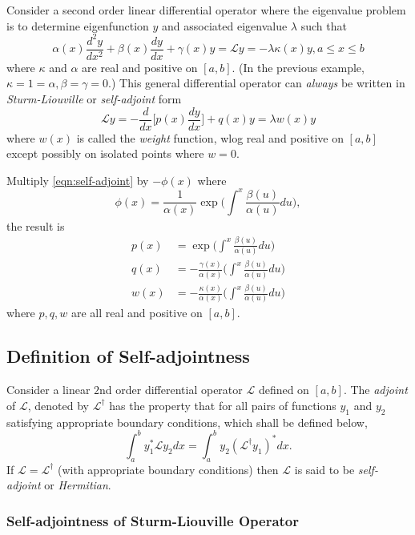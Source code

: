 \documentclass[a4paper]{article}
\renewcommand*\L{\mathcal{L}}
\begin{document}
Consider a second order linear differential operator where the eigenvalue problem is to determine eigenfunction \(y\) and associated eigenvalue \(\lambda\) such that
\begin{equation}
  \label{eqn:self-adjoint}
\alpha(x) \frac{d^2y}{dx^2} + \beta(x) \frac{dy}{dx} + \gamma(x) y = \L y = -\lambda \kappa(x) y, a \leq x\leq b
\tag{\(\ast\)}
\end{equation}
where \(\kappa\) and \(\alpha\) are real and positive on \([a,b]\). (In the previous example, \(\kappa = 1 = \alpha, \beta=\gamma=0\).) This general differential operator can \emph{always} be written in \emph{Sturm-Liouville} or \emph{self-adjoint} form
\[
\L y = - \frac{d}{dx} \Big[ p(x) \frac{dy}{dx} \Big] + q(x) y =\lambda w(x) y
\]
where \(w(x)\) is called the \emph{weight} function, wlog real and positive on \([a,b]\) except possibly on isolated points where \(w=0\).

Multiply \eqref{eqn:self-adjoint} by \(-\phi(x)\) where
\[
\phi(x) = \frac{1}{\alpha(x)}\exp \Big(\int_{ }^{x} \frac{\beta(u)}{\alpha(u)} du \Big),
\]
the result is
\begin{align*}
  p(x) &= \exp \Big( \int^x \frac{\beta(u)}{\alpha(u)}du \Big) \\
  q(x) &= -\frac{\gamma(x)}{\alpha(x)} \Big( \int^x \frac{\beta(u)}{\alpha(u)}du \Big) \\
  w(x) &= -\frac{\kappa(x)}{\alpha(x)} \Big( \int^x \frac{\beta(u)}{\alpha(u)}du \Big)
\end{align*}
where \(p, q, w\) are all real and positive on \([a,b]\).

\subsection{Definition of Self-adjointness}

Consider a linear \(2\)nd order differential operator \(\L\) defined on \([a,b]\). The \emph{adjoint} of \(\L\), denoted by \(\L^\dag\) has the property that for all pairs of functions \(y_1\) and \(y_2\) satisfying appropriate boundary conditions, which shall be defined below,
\[
\int_a^b y_1^* \L y_2 dx = \int_a^b y_2 (\L^\dag y_1)^* dx.
\]
If \(\L = \L^\dag\) (with appropriate boundary conditions) then \(\L\) is said to be \emph{self-adjoint} or \emph{Hermitian}.

\subsubsection{Self-adjointness of Sturm-Liouville Operator}
\end{document}
